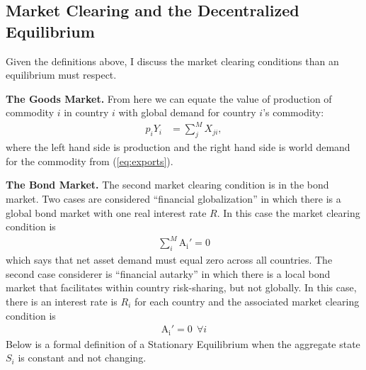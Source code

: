 \documentclass[12pt,pdftex]{article}
\begin{document}
\begin{onehalfspacing}
\subsection{Market Clearing and the Decentralized Equilibrium}

Given the definitions above, I discuss the market clearing conditions than an equilibrium must respect.

\textbf{The Goods Market.} From here we can equate the value of production of commodity $i$ in country $i$ with global demand for country $i$'s commodity:
\begin{align}
p_{i} Y_{i} &= \sum_{j}^{M}  X_{ji} \label{eq:goods-supply},
\end{align}
where the left hand side is production and the right hand side is world demand for the commodity from (\ref{eq:exports}).

\textbf{The Bond Market.} The second market clearing condition is in the bond market. Two cases are considered ``financial globalization'' in which there is a global bond market with one real interest rate $R$. In this case the market clearing condition is
\begin{align}
\sum_{i}^{M} \mathrm{A_i'} = 0
\label{eq:bond-market-global}
\end{align}
which says that net asset demand must equal zero across all countries. The second case considerer is ``financial autarky'' in which there is a local bond market that facilitates within country risk-sharing, but not globally. In this case, there is an interest rate is $R_i$ for each country and the associated market clearing condition is
\begin{align}
\mathrm{A_i'} = 0 \ \ \forall i
\label{eq:bond-market-country}
\end{align}
Below is a formal definition of a Stationary Equilibrium when the aggregate state $S_i$ is constant and not changing.


\end{onehalfspacing}
\end{document}
